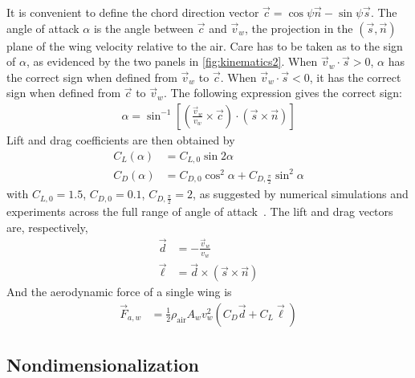\documentclass[11pt,letterpaper]{article}
\begin{document}
It is convenient to define the chord direction vector
$\vec{c} = \cos\psi \vec{n} - \sin\psi \vec{s}$.
The angle of attack $\alpha$ is the angle between
$\vec{c}$ and $\vec{v}_w$, the projection in the
$(\vec{s},\vec{n})$ plane of the wing velocity relative
to the air. Care has to be taken as to the sign of $\alpha$,
as evidenced by the two panels in \autoref{fig:kinematics2}.
When $\vec{v}_w \cdot \vec{s} > 0$, $\alpha$ has the correct sign
when defined from $\vec{v}_w$ to $\vec{c}$. When $\vec{v}_w \cdot \vec{s} < 0$,
it has the correct sign when defined from $\vec{c}$ to $\vec{v}_w$.
The following expression gives the correct sign:
\begin{align}
    \alpha = \sin^{-1} \left[\left( \frac{\vec{v}_w}{v_w} \times \vec{c} \right) \cdot \left( \vec{s} \times \vec{n} \right)\right]
\end{align}
Lift and drag coefficients are then obtained by
\begin{align}
    C_L(\alpha) &= C_{L,0} \sin 2\alpha \label{eq:cl} \\
    C_D(\alpha) &= C_{D,0} \cos^2 \alpha + C_{D,\frac{\pi}{2}} \sin^2 \alpha \label{eq:cd}
\end{align}
with $C_{L,0} = 1.5$, $C_{D,0} = 0.1$, $C_{D,\frac{\pi}{2}} = 2$,
as suggested by numerical simulations and experiments
across the full range of angle of attack~\cite{wang2004, wang2008}.
The lift and drag vectors are, respectively,
\begin{align}
    \vec{d} &= -\frac{\vec{v}_w}{v_w} \\
    \vec{\ell} &= \vec{d} \times \left( \vec{s} \times \vec{n} \right)
\end{align}
And the aerodynamic force of a single wing is
\begin{align}
    \vec{F}_{a,w} &= \frac12 \rho_\text{air} A_w v_w^2 \left( C_D \vec{d} + C_L \vec{\ell} \right)
\end{align}


\subsection{Nondimensionalization}
\end{document}
